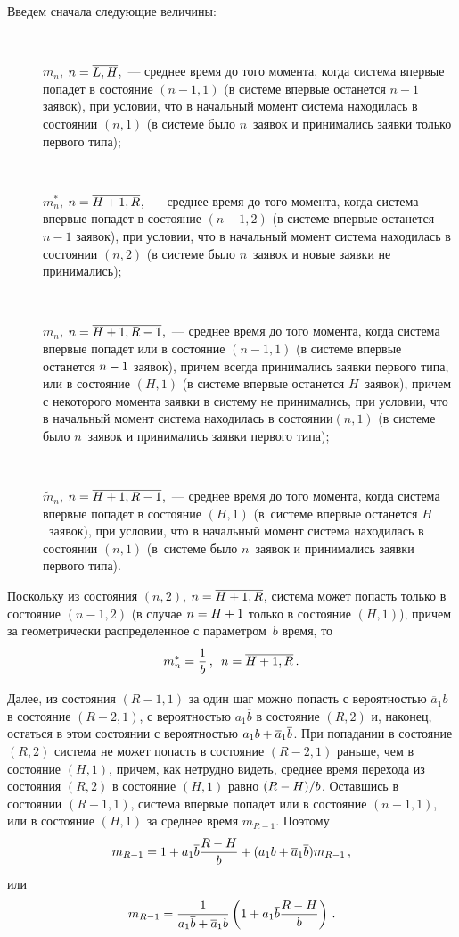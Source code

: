 \begin{multicols}{2}
Введем сначала следующие величины:
\begin{description}
\item[\,]
$m_n$, $n\hm=\overline{L,H}$,~--- среднее время до того момента,
когда система впервые попадет в состояние $(n-1,1)$
(в системе впервые останется $n-1$ заявок), при условии, что в начальный момент
система находилась в состоянии $(n,1)$
(в системе было $n$~заявок и принимались заявки только первого типа);
\item[\,]
$m^*_n$, $n\hm=\overline{H+1,R}$,~--- среднее время
до того момента, когда система впервые попадет в состояние $(n-1,2)$
(в системе впервые останется $n-1$ заявок), при условии, что в начальный момент
система находилась в состоянии $(n,2)$
(в системе было $n$~заявок и новые заявки не принимались);
\item[\,]
$m_n$, $n\hm=\overline{H+1,R-1}$,~--- среднее время
до того момента, когда система впервые попадет
или в состояние $(n-1,1)$ (в системе впервые останется
$n\hm-1$ заявок), причем всегда принимались заявки первого типа,
или в состояние $(H,1)$ (в системе впервые останется
$H$~заявок), причем с некоторого момента заявки в систему не принимались,
при условии, что в начальный момент система
находилась в состоянии$(n,1)$ (в системе было $n$~заявок
и принимались заявки первого типа);
\item[\,]
$\tilde{m}_n$, $n\hm=\overline{H+1,R-1}$,~--- среднее
время до того момента, когда система впервые попадет в со\-сто\-яние $(H,1)$
(в~системе впервые останется $H$~заявок),
при условии, что в начальный момент система находилась в состоянии $(n,1)$
(в~системе было $n$~заявок и принимались заявки первого типа).
\end{description}

Поскольку из состояния
$(n,2)$, $n\hm=\overline{H+1,R}$,
система может попасть только в состояние $(n-1,2)$
(в случае $n\hm=H\hm+1$ только в состояние $(H,1)$),
причем за геометрически распределенное с параметром~$b$ время, то
$$
m^*_{n} = \displaystyle\frac{\displaystyle 1\mathstrut}{\displaystyle b\mathstrut}\,,
\enskip n=\overline{H+1,R} \,.
$$

Далее, из состояния $(R-1,1)$ за один шаг можно попасть
с вероятностью $\overline{a}_1 b$ в состояние $(R-2,1)$,
с вероятностью $a_1 \overline{b}$  в состояние $(R,2)$
и, наконец, остаться в этом состоянии с вероятностью
$a_1 b \hm+ \overline{a}_1 \overline{b}$.
При попадании в состояние $(R,2)$ система не может
попасть в состояние $(R-2,1)$ раньше, чем в
состояние $(H,1)$, причем, как нетрудно видеть,
среднее время перехода из состояния $(R,2)$ в
состояние $(H,1)$ равно $(R\hm-H)/b$.
Оставшись в состоянии $(R-1,1)$, система впервые
попадет или в состояние $(n-1,1)$, или в
состояние $(H,1)$ за среднее время $m_{R-1}$.
Поэтому
$$
m_{R-1} = 1 + a_1 \overline{b}
\displaystyle\frac{\displaystyle R-H\mathstrut}{\displaystyle b\mathstrut} + (a_1 b + \overline{a}_1 \overline{b}) m_{R-1} \,,
$$
или
$$
m_{R-1} = \displaystyle\frac{\displaystyle 1 \mathstrut}{\displaystyle a_1 \overline{b} + \overline{a}_1 b\mathstrut}
\left( 1 + a_1 \overline{b} \displaystyle\frac{\displaystyle R-H\mathstrut}{\displaystyle b\mathstrut} \right)\,.
$$


\end{multicols}
